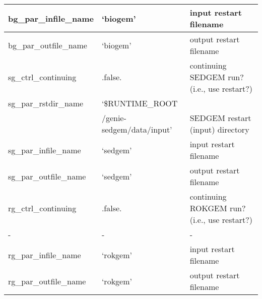 \documentclass[english,10pt,twoside]{article}
\begin{document}
\begin{tabular}{ | l | l | l |}
   bg\_par\_infile\_name & `biogem' & input restart filename \\ \hline
   bg\_par\_outfile\_name & `biogem' & output restart filename \\ \hline
   sg\_ctrl\_continuing & .false. & continuing SEDGEM run? (i.e., use restart?) \\ \hline
   sg\_par\_rstdir\_name & `\$RUNTIME\_ROOT & \\
    & /genie-sedgem/data/input' & SEDGEM restart (input) directory \\ \hline
   sg\_par\_infile\_name & `sedgem' & input restart filename \\ \hline
   sg\_par\_outfile\_name & `sedgem' & output restart filename \\ \hline
   rg\_ctrl\_continuing & .false. & continuing ROKGEM run? (i.e., use restart?) \\ \hline
   - & - & - \\ \hline
   rg\_par\_infile\_name & `rokgem' & input restart filename \\ \hline
   rg\_par\_outfile\_name & `rokgem' & output restart filename \\ \hline
   \end{tabular}
\end{document}

